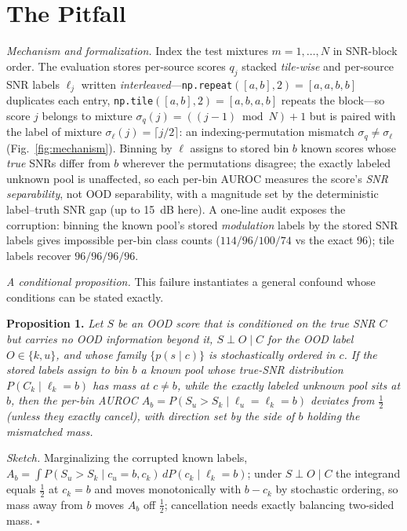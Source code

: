 \documentclass[journal,letterpaper]{IEEEtran}
\begin{document}
\section{The Pitfall}
\label{sec:pitfall}

\emph{Mechanism and formalization.} Index the test mixtures
$m = 1, \dots, N$ in SNR-block order. The evaluation stores per-source
scores $q_j$ stacked \emph{tile-wise} and per-source SNR labels
$\ell_j$ written \emph{interleaved}---\texttt{np.repeat}$([a,b],2) =
[a,a,b,b]$ duplicates each entry, \texttt{np.tile}$([a,b],2) =
[a,b,a,b]$ repeats the block---so score $j$
belongs to mixture $\sigma_q(j) = ((j-1) \bmod N) + 1$ but is paired
with the label of mixture $\sigma_\ell(j) = \lceil j/2 \rceil$: an
indexing-permutation mismatch $\sigma_q \neq \sigma_\ell$
(Fig.~\ref{fig:mechanism}). Binning by $\ell$ assigns to stored bin
$b$ known scores whose \emph{true} SNRs differ from $b$ wherever the
permutations disagree; the exactly labeled unknown pool is unaffected,
so each per-bin AUROC measures the score's \emph{SNR separability},
not OOD separability, with a magnitude set by the deterministic
label--truth SNR gap (up to \SI{15}{dB} here). A one-line audit
exposes the corruption: binning the
known pool's stored \emph{modulation} labels by the stored SNR labels
gives impossible per-bin class counts ($114/96/100/74$ vs the exact
$96$); tile labels recover $96/96/96/96$.

\emph{A conditional proposition.} This failure instantiates a general
confound whose conditions can be stated exactly.

\textbf{Proposition 1.} \emph{Let $S$ be an OOD score that is
conditioned on the true SNR $C$ but carries no OOD information beyond
it, $S \perp O \mid C$ for the OOD label $O \in \{k, u\}$, and whose
family $\{p(s \mid c)\}$ is stochastically ordered in $c$. If the
stored labels assign to bin $b$ a known pool whose true-SNR
distribution $P(C_k \mid \ell_k {=} b)$ has mass at $c \neq b$, while
the exactly labeled unknown pool sits at $b$, then the per-bin AUROC
$A_b = P(S_u {>} S_k \mid \ell_u {=} \ell_k {=} b)$ deviates from
$\tfrac{1}{2}$ (unless they exactly cancel), with
direction set by the side of $b$ holding the mismatched mass.}

\emph{Sketch.} Marginalizing the corrupted known labels,
$A_b = \int P(S_u {>} S_k \mid c_u {=} b, c_k)\, dP(c_k \mid
\ell_k {=} b)$; under $S \perp O \mid C$ the integrand equals
$\tfrac{1}{2}$ at $c_k = b$ and moves monotonically with $b - c_k$ by
stochastic ordering, so mass away from $b$ moves $A_b$ off
$\tfrac{1}{2}$; cancellation needs exactly balancing two-sided mass.
\hfill$\square$
\end{document}
